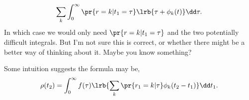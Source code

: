 $$\sum_k \int_0^\infty \pr{r = k| t_1 = \tau}\lrb{\tau + \phi_k(t)} \dd \tau.$$
In which case we would only need $\pr{r = k| t_1 = \tau}$ and the two potentially difficult integrals. But I'm not sure this is correct, or whether there might be a better way of thinking about it. Maybe you know something?\par

\vspace{5pt}

Some intuition suggests the formula may be,    
$$\rho(t_2) = \int^{\infty}_0 f(\tau)\lrb{\sum_k \pr{r_1 = k|\tau} \phi_k(t_2 - t_1)  } \dd t_1.$$



